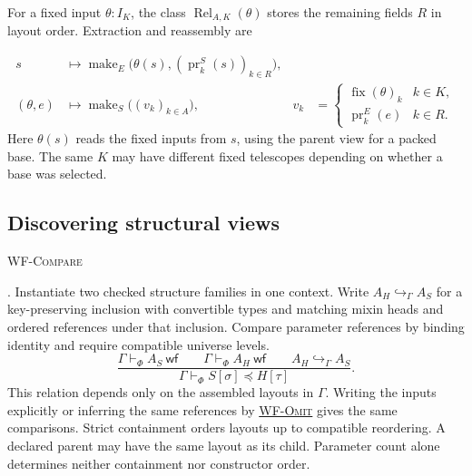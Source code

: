 \documentclass{article}
\newcommand{\proj}{\operatorname{pr}}
\newcommand{\make}{\operatorname{make}}
\newcommand{\rel}{\operatorname{Rel}}
\newcommand{\wf}{\mathsf{wf}}
\newcommand{\rdefn}[1]{\hypertarget{rule-#1}{\textsc{#1}}}
\newcommand{\ruse}[1]{\hyperlink{rule-#1}{\textsc{#1}}}
\begin{document}
For a fixed input $\theta:I_K$, the class $\rel_{A,K}(\theta)$ stores
the remaining fields $R$ in layout order. Extraction and reassembly are

\[
\begin{aligned}
 s &\longmapsto
    \make_E\bigl(\theta(s),(\proj^S_k(s))_{k\in R}\bigr),\\
 (\theta,e)&\longmapsto \make_S\bigl((v_k)_{k\in A}\bigr),
 & v_k&=\begin{cases}\operatorname{fix}(\theta)_k & k\in K,\\
                     \proj^E_k(e)&k\in R.\end{cases}
\end{aligned}
\]
Here $\theta(s)$ reads the fixed inputs from $s$, using the parent view
for a packed base. The same $K$ may have different fixed telescopes
depending on whether a base was selected.

\subsection{Discovering structural views}

\rdefn{WF-Compare}. Instantiate two checked structure families in one
context. Write $A_H\hookrightarrow_\Gamma A_S$ for a key-preserving
inclusion with convertible types and matching mixin heads and ordered
references under that inclusion. Compare parameter references by
binding identity and require compatible universe levels.
\[
 \frac{\Gamma\vdash_\Phi A_S\ \wf\qquad \Gamma\vdash_\Phi A_H\ \wf
       \qquad A_H\hookrightarrow_\Gamma A_S}
      {\Gamma\vdash_\Phi S[\sigma]\preceq H[\tau]} .
\]
This relation depends only on the assembled layouts in $\Gamma$.
Writing the inputs explicitly or inferring the same references by
\ruse{WF-Omit} gives the same comparisons. Strict containment orders
layouts up to compatible reordering. A
declared parent may have the same layout as its child. Parameter count
alone determines neither containment nor constructor order.
\end{document}
